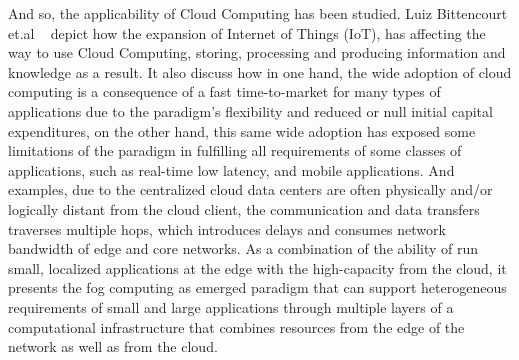 And so, the applicability of Cloud Computing has been studied. Luiz Bittencourt et.al ~\cite{iot_fog_cloud} depict how the expansion of Internet of Things (IoT), has affecting the way to use Cloud Computing, storing, processing and producing information and knowledge as a result.
It also discuss how in one hand, the wide adoption of cloud computing is a consequence of a fast time-to-market for many types of applications due to the paradigm’s flexibility and reduced or null initial capital expenditures, on the other hand, this same wide adoption has exposed some limitations of the paradigm in fulfilling all requirements of some classes of applications, such as real-time low latency, and mobile applications.
And examples, due to the centralized cloud data centers are often physically and/or logically distant from the cloud client, the communication and data transfers traverses multiple hops, which introduces delays and consumes network bandwidth of edge and core networks. As a combination of the ability of run small, localized applications at the edge with the high-capacity from the cloud, it presents the fog computing as emerged paradigm that can support heterogeneous requirements of small and large applications through multiple layers of a computational infrastructure that combines resources from the edge of the network as well as from the cloud.

